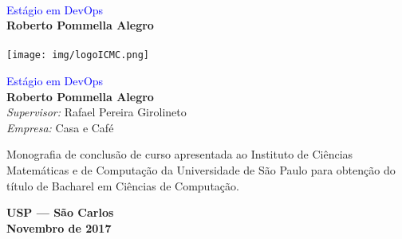 \documentclass[12pt,times,a4paper,twoside]{icmc}
\newcommand{\tituloMonografia}{Estágio em DevOps}
\newcommand{\nomeAluno}{Roberto Pommella Alegro}
\newcommand{\nomeSupervisor}{Rafael Pereira Girolineto}
\newcommand{\nomeEmpresa}{Casa e Café}
\begin{document}

\begin{titlepage}
\pagestyle{empty} %

\begin{center}
\begin{minipage}[c]{12cm}
\begin{center}
\vspace{.35\textheight}
\hrulefill\\
    \vspace{.5cm} {\Large \textcolor{blue}{\tituloMonografia}}\\
    \vspace{1.3cm}
    \textbf{\nomeAluno}\\
      \vspace{.5cm}
      \hrulefill\\
        \vspace{5cm}
        \texttt{[image: img/logoICMC.png]}
        \end{center}
        \end{minipage}
        \end{center}


        \cleardoublepage%


        \vspace*{3cm}
        \begin{center}
{\huge\sf \textcolor{blue}{\tituloMonografia}} \\
    \vspace*{2cm}
{\bf \nomeAluno} \\
    \vspace*{2cm}
    \emph{Supervisor:}  {\nomeSupervisor}\\
      \emph{Empresa:}  {\nomeEmpresa}
      \end{center}
      \vspace*{3cm}

      \begin{flushright}
      \begin{minipage}{10cm}
      Monografia de conclusão de curso apresentada ao
      Instituto de Ciências Matemáticas e de Computação da Universidade de São Paulo para obtenção do título de Bacharel em
      Ciências de Computação.
      \end{minipage}
      \end{flushright}

      \vspace*{2cm}
      \begin{center}
      \textbf{USP --- São Carlos \\ Novembro de 2017}
      \end{center}

      \cleardoublepage%

      \end{titlepage}
\end{document}
